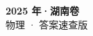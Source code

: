 \documentclass[zihao=-4, a4paper]{ctexart}
\begin{document}
\begin{center}
  {\Large\bfseries 2025 年·湖南卷}\\[4pt]
  {\large 物理 · 答案速查版}
\end{center}
\medskip
{}

\clearpage
{}

\end{document}

